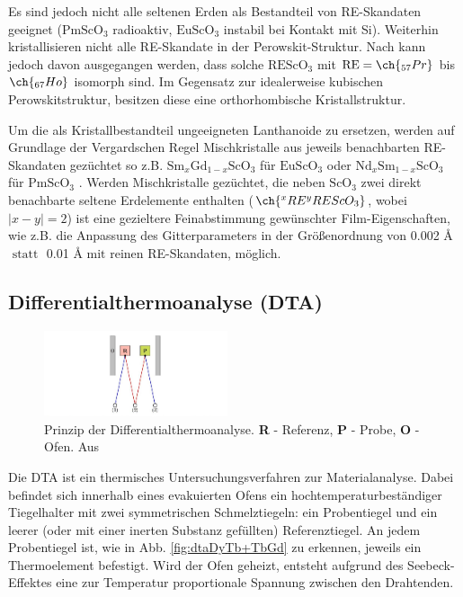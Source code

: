 \documentclass[aps,twocolumn,secnumarabic,nobalancelastpage,amsmath,amssymb,
nofootinbib,superscriptaddress]{revtex4-1}
\begin{document}
Es sind jedoch nicht alle seltenen Erden als Bestandteil von RE-Skandaten geeignet ($\text{PmScO}_3$ radioaktiv, $\text{EuScO}_3$ instabil bei Kontakt mit Si).
Weiterhin kristallisieren nicht alle RE-Skandate in der Perowskit-Struktur. Nach \cite{perowskHoPr} kann jedoch davon ausgegangen werden, dass solche $\text{REScO}_3$ mit
$\text{RE}=\ch{_{57}Pr}$ bis $\ch{_{67}Ho}$ isomorph sind. Im Gegensatz zur idealerweise kubischen Perowskitstruktur, besitzen diese eine orthorhombische Kristallstruktur.

Um die als Kristallbestandteil ungeeigneten Lanthanoide zu ersetzen, werden auf Grundlage der Vergardschen Regel Mischkristalle aus jeweils benachbarten RE-Skandaten gezüchtet so z.B.
$\text{Sm}_x\text{Gd}_{1-x}\text{ScO}_3$ für $\text{EuScO}_3$ oder $\text{Nd}_x\text{Sm}_{1-x}\text{ScO}_3$ für $\text{PmScO}_3$ \cite{paperK}. Werden Mischkristalle gezüchtet,
die neben $\text{ScO}_3$ zwei direkt benachbarte seltene Erdelemente enthalten ($\ch{^{x}RE^{y}REScO_3}$, wobei $|x-y|=2$) ist eine gezieltere Feinabstimmung gewünschter
Film-Eigenschaften, wie z.B. die Anpassung des Gitterparameters in der Größenordnung von 0.002 \AA$\text{ statt }$ 0.01 \AA$\text{ mit}$ reinen RE-Skandaten, möglich.

\subsection{Differentialthermoanalyse (DTA)}
\begin{figure}[t]
  \centering
  \includegraphics[width=0.48\textwidth]{../img/exp.jpg}
  \caption{\label{fig:exp} Prinzip der Differentialthermoanalyse. \textbf{R} - Referenz, \textbf{P} - Probe, \textbf{O} - Ofen. Aus \cite{versuchsbeschr}}
\end{figure}

\noindent Die DTA ist ein thermisches Untersuchungsverfahren zur Materialanalyse. Dabei befindet sich innerhalb eines evakuierten Ofens ein hochtemperaturbeständiger Tiegelhalter
mit zwei symmetrischen Schmelztiegeln: ein Probentiegel und ein leerer (oder mit einer inerten Substanz gefüllten) Referenztiegel. An jedem Probentiegel ist,
wie in Abb. \ref{fig:dtaDyTb+TbGd} zu erkennen, jeweils ein Thermoelement befestigt. Wird der Ofen geheizt, entsteht aufgrund des Seebeck-Effektes eine zur Temperatur proportionale Spannung zwischen den Drahtenden.
\end{document}
